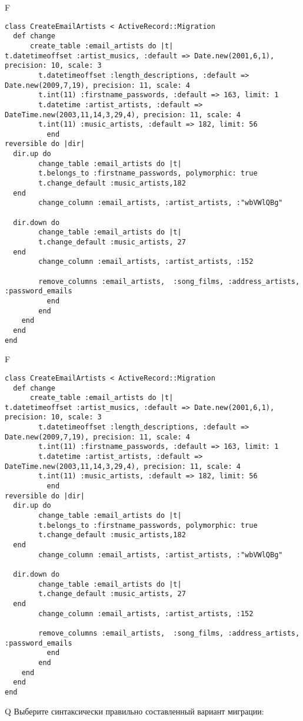 F
\begin{verbatim}
class CreateEmailArtists < ActiveRecord::Migration
  def change
	  create_table :email_artists do |t|
t.datetimeoffset :artist_musics, :default => Date.new(2001,6,1), precision: 10, scale: 3
		t.datetimeoffset :length_descriptions, :default => Date.new(2009,7,19), precision: 11, scale: 4
		t.int(11) :firstname_passwords, :default => 163, limit: 1
		t.datetime :artist_artists, :default => DateTime.new(2003,11,14,3,29,4), precision: 11, scale: 4
		t.int(11) :music_artists, :default => 182, limit: 56
		  end
reversible do |dir|
  dir.up do
		change_table :email_artists do |t|
		t.belongs_to :firstname_passwords, polymorphic: true
 		t.change_default :music_artists,182
  end
 		change_column :email_artists, :artist_artists, :"wbVWlQBg"
   
  dir.down do
		change_table :email_artists do |t|
		t.change_default :music_artists, 27
  end
 		change_column :email_artists, :artist_artists, :152
   
		remove_columns :email_artists,  :song_films, :address_artists, :password_emails 
	      end
	    end
    end 
  end
end

\end{verbatim}

F
\begin{verbatim}
class CreateEmailArtists < ActiveRecord::Migration
  def change
	  create_table :email_artists do |t|
t.datetimeoffset :artist_musics, :default => Date.new(2001,6,1), precision: 10, scale: 3
		t.datetimeoffset :length_descriptions, :default => Date.new(2009,7,19), precision: 11, scale: 4
		t.int(11) :firstname_passwords, :default => 163, limit: 1
		t.datetime :artist_artists, :default => DateTime.new(2003,11,14,3,29,4), precision: 11, scale: 4
		t.int(11) :music_artists, :default => 182, limit: 56
		  end
reversible do |dir|
  dir.up do
		change_table :email_artists do |t|
		t.belongs_to :firstname_passwords, polymorphic: true
 		t.change_default :music_artists,182
  end
 		change_column :email_artists, :artist_artists, :"wbVWlQBg"
   
  dir.down do
		change_table :email_artists do |t|
		t.change_default :music_artists, 27
  end
 		change_column :email_artists, :artist_artists, :152
   
		remove_columns :email_artists,  :song_films, :address_artists, :password_emails 
	      end
	    end
    end 
  end
end

\end{verbatim}

Q
Выберите синтаксически правильно составленный вариант миграции:


